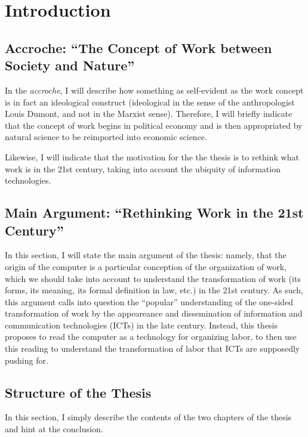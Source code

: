 \documentclass[version=last,draft=true,paper=A4,portrait,twoside=true,twocolumn=true,headinclude=false,footinclude=false,fontsize=10,BCOR=20mm,DIV=13,pagesize=auto,titlepage=false,mpinclude=false,open=right,chapterprefix=true,numbers=autoendperiod,headsepline=false,parskip=false]{scrbook}
\author{Carlos Alberto Rivera Carreño}
\date{}
\title{}
\begin{document}
\nocite{*}
\chapter{Introduction}
\label{sec:org722e8fb}
\section{Accroche: ``The Concept of Work between Society and Nature''}
\label{sec:orgf760722}
In the \emph{accroche}, I will describe how something as self-evident as the work
concept is in fact an ideological construct (ideological in the sense of
the anthropologist Louis Dumont, and not in the Marxist sense). Therefore,
I will briefly indicate that the concept of work begins in political
economy and is then appropriated by natural science to be reimported into
economic science.  

Likewise, I will indicate that the motivation for the the thesis is to
rethink what work is in the 21st century, taking into account the ubiquity
of information technologies. 

\printbibliography[heading=none,keyword=introduction-1]
\section{Main Argument: ``Rethinking Work in the 21st Century''}
\label{sec:orgbbf1c41}
In this section, I will state the main argument of the thesis: namely, that
the origin of the computer is a particular conception of the organization
of work, which we should take into account to understand the transformation
of work (its forms, its meaning, its formal definition in law, etc.) in the
21st century. As such, this argument calls into question the ``popular''
understanding of the one-sided transformation of work by the appeareance
and dissemination of information and communication technologies (ICTs) in
the late  century. Instead, this thesis proposes to read the
computer as a technology for organizing labor, to then use this reading to
understand the transformation of labor that ICTs are supposedly pushing
for. 

\printbibliography[heading=none,keyword=introduction-2]
\section{Structure of the Thesis}
\label{sec:orga322746}
In this section, I simply describe the contents of the two chapters of the
thesis and hint at the conclusion. 
\end{document}
